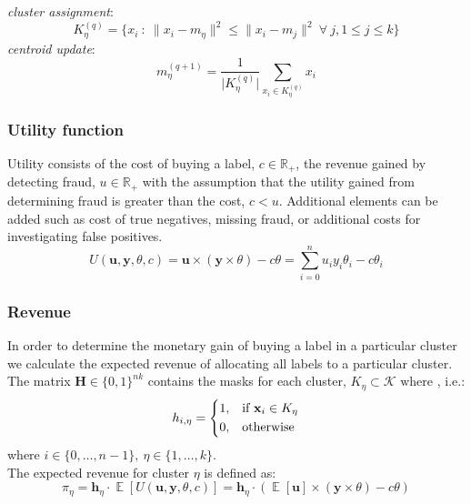 \documentclass[paper=a4, fontsize=12pt]{scrartcl}
\begin{document}
\noindent\textit{cluster assignment}:
\begin{equation}
K_{\eta}^{(q)} = \{x_i~:~\lVert x_i - m_{\eta} \rVert^{2} \leq \lVert x_i - m_{j} \rVert^{2}~\forall~j, 1 \leq j \leq k\}
\end{equation}
\textit{centroid update}:
\begin{equation}
m_{\eta}^{(q + 1)} = \frac{1}{\lvert K_{\eta}^{(q)}\rvert}\sum_{x_{i} \in K_{\eta}^{(q)}} x_{i}
\end{equation}

\subsubsection*{Utility function}
Utility consists of the cost of buying a label, $c \in \mathbb{R_{+}}$, the revenue gained by detecting fraud, $u \in \mathbb{R_+}$ with the assumption that the
utility gained from determining fraud is greater than the cost, $c < u$. Additional elements can be added such as cost of true negatives, missing fraud, or additional costs for investigating false positives.
\begin{equation}
U(\textbf{u}, \mathbf{y}, \theta, c) = \textbf{u} \times (\textbf{y} \times \theta) - c \theta = \sum_{i=0}^{n}u_{i}y_{i}\theta_{i} - c\theta_{i}
\end{equation}

\subsubsection*{Revenue}
In order to determine the monetary gain of buying a label in a particular cluster we calculate the expected revenue of allocating all labels to a particular cluster. The matrix $\textbf{H} \in {\{0,1\}}^{nk}$ contains the masks for each cluster, $K_\eta \subset \mathcal{K} \text{ where } $, i.e.:
\begin{equation}
h_{i,\eta}=
\begin{dcases}
1,& \text{if } \textbf{x}_{i} \in K_\eta\\
0, & \text{otherwise}
\end{dcases}
\end{equation}
where $i \in \{0,\ldots,n-1\},~\eta \in \{1, \ldots, k\}$.\\

The expected revenue for cluster $\eta$ is defined as:
\begin{equation}
\pi_{\eta} = \textbf{h}_{\eta} \cdot \mathop{\mathbb{E}}[U(\textbf{u}, \mathbf{y}, \theta, c)] = \textbf{h}_{\eta} \cdot (\mathop{\mathbb{E}}[\textbf{u}] \times (\textbf{y} \times \theta) - c\theta)
\end{equation}
\end{document}
